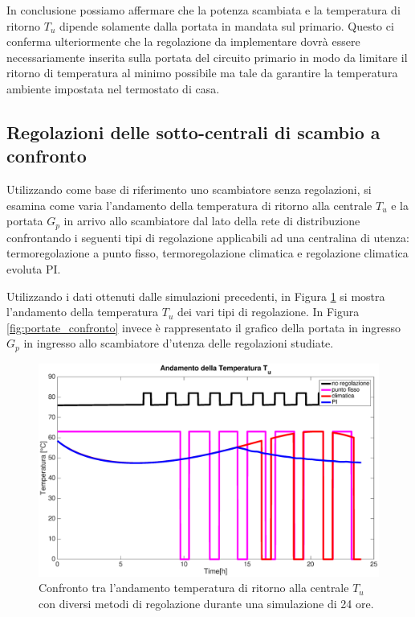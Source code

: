\documentclass[laurea,oneside,11pt]{USiena_tesiLM3}
\begin{document}
In conclusione possiamo affermare che la potenza scambiata e la temperatura di ritorno $T_u$ dipende solamente dalla portata in mandata sul primario.
Questo ci conferma ulteriormente che la regolazione da implementare dovrà essere necessariamente inserita sulla portata del circuito primario in modo da limitare il ritorno di temperatura al minimo possibile ma tale da garantire la temperatura ambiente impostata nel termostato di casa.

\subsection{Regolazioni delle sotto-centrali di scambio a confronto}
Utilizzando come base di riferimento uno scambiatore senza regolazioni, si esamina come varia l'andamento della temperatura di ritorno alla centrale $T_u$ e la portata $G_p$ in arrivo allo scambiatore dal lato della rete di distribuzione  confrontando i seguenti tipi di regolazione applicabili ad una centralina di utenza: termoregolazione a punto fisso, termoregolazione climatica e regolazione climatica evoluta PI.

Utilizzando i dati ottenuti dalle simulazioni precedenti, in Figura \ref{fig:To_confronto}  si mostra l'andamento della  temperatura $T_u$ dei vari tipi di regolazione. In Figura \ref{fig:portate_confronto} invece è rappresentato il grafico della portata in ingresso $G_p$ in ingresso allo scambiatore d'utenza delle regolazioni studiate. 

\begin{figure}[!ht]
\centering
\includegraphics[width=\textwidth]{figure/To_confronto} 
\caption{Confronto tra l'andamento temperatura di ritorno alla centrale $T_u$ con diversi metodi di regolazione durante una simulazione di 24 ore.}
\label{fig:To_confronto}
\end{figure}
\end{document}

